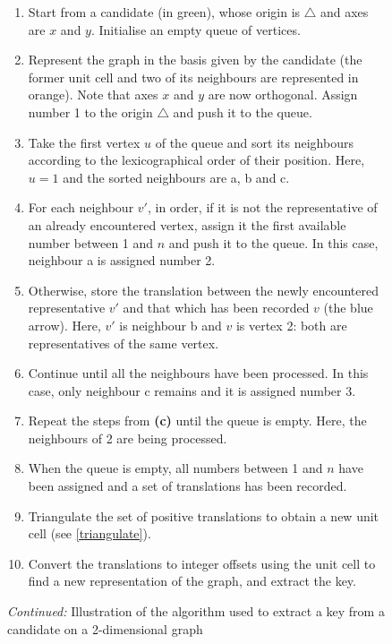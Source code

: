 \documentclass[main.tex]{subfiles}
\begin{document}
\begin{figure}\ContinuedFloat
	\begin{fminipage}{\linewidth}
	\begin{enumerate}[label={\sffamily\small\bfseries(\alph*)},itemsep=0em]
		\item Start from a candidate (in {\color{green!50!black}green}), whose origin is $\boldsymbol\triangle$ and axes are $x$ and $y$. Initialise an empty queue of vertices.
		\item Represent the graph in the basis given by the candidate (the former unit cell and two of its neighbours are represented in {\color{orange}orange}). Note that axes $x$ and $y$ are now orthogonal. Assign number 1 to the origin $\boldsymbol\triangle$ and push it to the queue.
		\item Take the first vertex $u$ of the queue and sort its neighbours according to the lexicographical order of their position. Here, $u = 1$ and the sorted neighbours are a, b and c.
		\item For each neighbour $v'$, in order, if it is not the representative of an already encountered vertex, assign it the first available number between 1 and $n$ and push it to the queue. In this case, neighbour a is assigned number 2.
		\item Otherwise, store the translation between the newly encountered representative $v'$ and that which has been recorded $v$ (the {\color{blue}blue} arrow). Here, $v'$ is neighbour b and $v$ is vertex 2: both are representatives of the same vertex.
		\item Continue until all the neighbours have been processed. In this case, only neighbour c remains and it is assigned number 3.
		\item Repeat the steps from {\sffamily\small\bfseries(c)} until the queue is empty. Here, the neighbours of 2 are being processed.
		\item When the queue is empty, all numbers between 1 and $n$ have been assigned and a set of translations has been recorded.
		\item Triangulate the set of positive translations to obtain a new unit cell (see \autoref{triangulate}).
		\item Convert the translations to integer offsets using the unit cell to find a new representation of the graph, and extract the key.
	\end{enumerate}
	\vspace{8mm}
	
	\caption{\emph{Continued:} Illustration of the algorithm used to extract a key from a candidate on a 2-dimensional graph} \label{algocandidate}
	\end{fminipage}
\end{figure}
\end{document}
